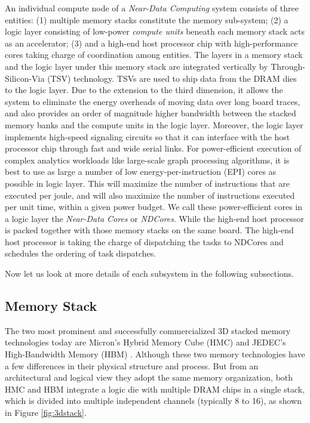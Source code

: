 \documentclass[letterpaper, 11pt, conference, margin=1in]{ieeeconf}   %
\begin{document}
An individual compute node of a \textit{Near-Data Computing} system consists of three entities: (1) multiple memory stacks constitute the memory sub-system; (2) a logic layer consisting of low-power \textit{compute units} beneath each memory stack acts as an accelerator; (3) and a high-end host processor chip with high-performance cores taking charge of coordination among entities. The layers in a memory stack and the logic layer under this memory stack are integrated vertically by Through-Silicon-Via (TSV) technology. TSVs are used to ship data from the DRAM dies to the logic layer. Due to the extension to the third dimension, it allows the system to eliminate the energy overheads of moving data over long board traces, and also provides an order of magnitude higher bandwidth between the stacked memory banks and the compute units in the logic layer. Moreover, the logic layer implements high-speed signaling circuits so that it can interface with the host processor chip through fast and wide serial links. For power-efficient execution of complex analytics workloads like large-scale graph processing algorithms, it is best to use as large a number of low energy-per-instruction (EPI) cores as possible in logic layer. This will maximize the number of instructions that are executed per joule, and will also maximize the number of instructions executed per unit time, within a given power budget. We call these power-efficient cores in a logic layer the \textit{Near-Data Cores} or \textit{NDCores}. While the high-end host processor is packed together with those memory stacks on the same board. The high-end host processor is taking the charge of dispatching the tasks to NDCores and schedules the ordering of task dispatches.

Now let us look at more details of each subsystem in the following subsections.

\subsection{\bf Memory Stack}
The two most prominent and successfully commercialized 3D stacked memory technologies today are Micron's Hybrid Memory Cube (HMC) \cite{HMC-2.1} and JEDEC's High-Bandwidth Memory (HBM) \cite{HBM}. Although these two memory technologies have a few differences in their physical structure and process. But from an architectural and logical view they adopt the same memory organization, both HMC and HBM integrate a logic die with multiple DRAM chips in a single stack, which is divided into multiple independent channels (typically 8 to 16), as shown in Figure \ref{fig:3dstack}.
\end{document}
